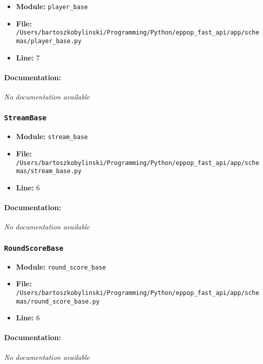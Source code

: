 \documentclass[11pt,a4paper]{article}
\begin{document}
\begin{itemize}
    \item \textbf{Module:} \texttt{player\_base}
    \item \textbf{File:} \texttt{/Users/bartoszkobylinski/Programming/Python/eppop\_fast\_api/app/schemas/player\_base.py}
    \item \textbf{Line:} 7
\end{itemize}

\paragraph{Documentation:} \textit{No documentation available}


\vspace{1em}
\subsubsection{\texttt{StreamBase}}

\begin{itemize}
    \item \textbf{Module:} \texttt{stream\_base}
    \item \textbf{File:} \texttt{/Users/bartoszkobylinski/Programming/Python/eppop\_fast\_api/app/schemas/stream\_base.py}
    \item \textbf{Line:} 6
\end{itemize}

\paragraph{Documentation:} \textit{No documentation available}


\vspace{1em}
\subsubsection{\texttt{RoundScoreBase}}

\begin{itemize}
    \item \textbf{Module:} \texttt{round\_score\_base}
    \item \textbf{File:} \texttt{/Users/bartoszkobylinski/Programming/Python/eppop\_fast\_api/app/schemas/round\_score\_base.py}
    \item \textbf{Line:} 6
\end{itemize}

\paragraph{Documentation:} \textit{No documentation available}
\end{document}
